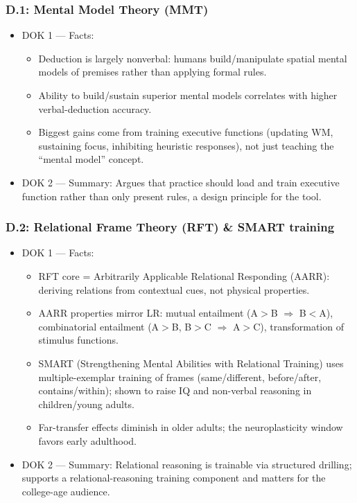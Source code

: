 \documentclass[11pt]{article}
\begin{document}
\subsubsection*{D.1: Mental Model Theory (MMT)}
\begin{itemize}
\item DOK 1 --- Facts:
\begin{itemize}
\item Deduction is largely nonverbal: humans build/manipulate spatial mental models of premises rather than applying formal rules.
\item Ability to build/sustain superior mental models correlates with higher verbal-deduction accuracy.
\item Biggest gains come from training executive functions (updating WM, sustaining focus, inhibiting heuristic responses), not just teaching the \enquote{mental model} concept.
\end{itemize}
\item DOK 2 --- Summary: Argues that practice should load and train executive function rather than only present rules, a design principle for the tool.
\end{itemize}
\subsubsection*{D.2: Relational Frame Theory (RFT) \& SMART training}
\begin{itemize}
\item DOK 1 --- Facts:
\begin{itemize}
\item RFT core = Arbitrarily Applicable Relational Responding (AARR): deriving relations from contextual cues, not physical properties.
\item AARR properties mirror LR: mutual entailment (A$>$B $\Rightarrow$ B$<$A), combinatorial entailment (A$>$B, B$>$C $\Rightarrow$ A$>$C), transformation of stimulus functions.
\item SMART (Strengthening Mental Abilities with Relational Training) uses multiple-exemplar training of frames (same/different, before/after, contains/within); shown to raise IQ and non-verbal reasoning in children/young adults.
\item Far-transfer effects diminish in older adults; the neuroplasticity window favors early adulthood.
\end{itemize}
\item DOK 2 --- Summary: Relational reasoning is trainable via structured drilling; supports a relational-reasoning training component and matters for the college-age audience.
\end{itemize}
\end{document}
